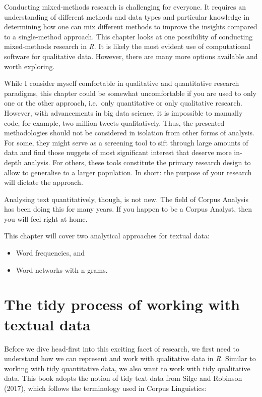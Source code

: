 \documentclass[
  letterpaper,
  DIV=11,
  numbers=noendperiod]{scrreprt}
\begin{document}
Conducting mixed-methods research is challenging for everyone. It
requires an understanding of different methods and data types and
particular knowledge in determining how one can mix different methods to
improve the insights compared to a single-method approach. This chapter
looks at one possibility of conducting mixed-methods research in
\emph{R}. It is likely the most evident use of computational software
for qualitative data. However, there are many more options available and
worth exploring.

While I consider myself comfortable in qualitative and quantitative
research paradigms, this chapter could be somewhat uncomfortable if you
are used to only one or the other approach, i.e.~only quantitative or
only qualitative research. However, with advancements in big data
science, it is impossible to manually code, for example, two million
tweets qualitatively. Thus, the presented methodologies should not be
considered in isolation from other forms of analysis. For some, they
might serve as a screening tool to sift through large amounts of data
and find those nuggets of most significant interest that deserve more
in-depth analysis. For others, these tools constitute the primary
research design to allow to generalise to a larger population. In short:
the purpose of your research will dictate the approach.

Analysing text quantitatively, though, is not new. The field of Corpus
Analysis has been doing this for many years. If you happen to be a
Corpus Analyst, then you will feel right at home.

This chapter will cover two analytical approaches for textual data:

\begin{itemize}
\item
  Word frequencies, and
\item
  Word networks with n-grams.
\end{itemize}

\section{The tidy process of working with textual
data}\label{sec-tidy-process-for-textual-data}

Before we dive head-first into this exciting facet of research, we first
need to understand how we can represent and work with qualitative data
in \emph{R}. Similar to working with tidy quantitative data, we also
want to work with tidy qualitative data. This book adopts the notion of
tidy text data from Silge and Robinson (2017), which follows the
terminology used in Corpus Linguistics:
\end{document}
